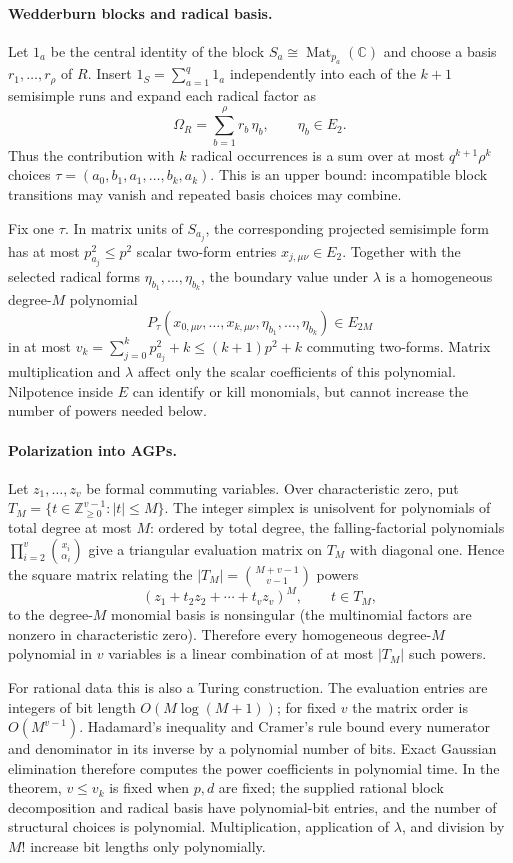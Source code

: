 \documentclass[11pt]{article}
\theoremstyle{definition}
\newcommand{\Mat}{\operatorname{Mat}}
\begin{document}
\paragraph{Wedderburn blocks and radical basis.}
Let $1_a$ be the central identity of the block
$S_a\cong\Mat_{p_a}(\mathbb C)$ and choose a basis
$r_1,\ldots,r_\rho$ of $R$.  Insert
$1_S=\sum_{a=1}^q1_a$ independently into each of the $k+1$ semisimple runs and
expand each radical factor as
\[
 \Omega_R=\sum_{b=1}^{\rho}r_b\,\eta_b,
 \qquad \eta_b\in E_2.
\]
Thus the contribution with $k$ radical occurrences is a sum over at most
$q^{k+1}\rho^k$ choices
$\tau=(a_0,b_1,a_1,\ldots,b_k,a_k)$.  This is an upper bound: incompatible
block transitions may vanish and repeated basis choices may combine.

Fix one $\tau$.  In matrix units of $S_{a_j}$, the corresponding projected
semisimple form has at most $p_{a_j}^2\le p^2$ scalar two-form entries
$x_{j,\mu\nu}\in E_2$.  Together with the selected radical forms
$\eta_{b_1},\ldots,\eta_{b_k}$, the boundary value under $\lambda$ is a
homogeneous degree-$M$ polynomial
\[
 P_\tau(x_{0,\mu\nu},\ldots,x_{k,\mu\nu},
        \eta_{b_1},\ldots,\eta_{b_k})\in E_{2M}
\]
in at most
$v_k=\sum_{j=0}^{k}p_{a_j}^2+k\le(k+1)p^2+k$ commuting two-forms.  Matrix
multiplication and $\lambda$ affect only the scalar coefficients of this
polynomial.  Nilpotence inside $E$ can identify or kill monomials, but cannot
increase the number of powers needed below.

\paragraph{Polarization into AGPs.}
Let $z_1,\ldots,z_v$ be formal commuting variables.  Over characteristic zero,
put $T_M=\{t\in\mathbb Z_{\ge0}^{v-1}:|t|\le M\}$.  The integer simplex is
unisolvent for polynomials of total degree at most $M$: ordered by total degree,
the falling-factorial polynomials
$\prod_{i=2}^v\binom{x_i}{\alpha_i}$ give a triangular evaluation matrix on
$T_M$ with diagonal one.  Hence the square matrix relating the
$|T_M|=\binom{M+v-1}{v-1}$ powers
\[
 (z_1+t_2z_2+\cdots+t_vz_v)^M,\qquad t\in T_M,
\]
to the degree-$M$ monomial basis is nonsingular (the multinomial factors are
nonzero in characteristic zero).  Therefore every homogeneous degree-$M$
polynomial in $v$ variables is a linear combination of at most $|T_M|$ such
powers.

For rational data this is also a Turing construction.  The evaluation entries
are integers of bit length $O(M\log(M+1))$; for fixed $v$ the matrix order is
$O(M^{v-1})$.  Hadamard's inequality and Cramer's rule bound every numerator
and denominator in its inverse by a polynomial number of bits.  Exact Gaussian
elimination therefore computes the power coefficients in polynomial time.  In
the theorem, $v\le v_k$ is fixed when $p,d$ are fixed; the supplied rational
block decomposition and radical basis have polynomial-bit entries, and the
number of structural choices is polynomial.  Multiplication, application of
$\lambda$, and division by $M!$ increase bit lengths only polynomially.
\end{document}
